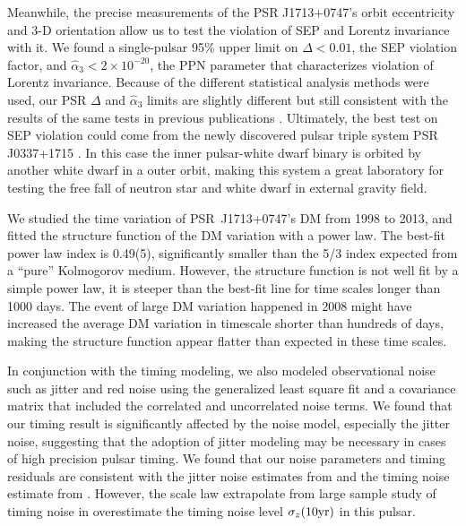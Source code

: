 
Meanwhile, the precise measurements of the PSR J1713+0747's orbit eccentricity and
3-D orientation allow us to test the violation of SEP and 
Lorentz invariance with it. We found a single-pulsar 95\% upper limit on 
$\Delta <0.01$, the SEP violation factor, and
$\hat{\alpha}_3<2\times10^{-20}$, the PPN parameter that characterizes
violation of Lorentz invariance. 
Because of the different statistical analysis methods were used, our PSR
$\Delta$ and $\hat{\alpha}_3$ limits  are slightly
different but still consistent with the results of the same tests in previous publications 
\citep{wex00, sns+05, sfl+05, gsf+11}.
Ultimately, the best test on SEP violation could come from the newly
discovered pulsar triple system PSR J0337+1715 \citep{rsa+14}. In this case 
the inner pulsar-white dwarf binary is orbited by another white dwarf in a
outer orbit, making this system a great laboratory for testing
the free fall of neutron star and white dwarf in external gravity field.

We studied the time variation of PSR~J1713+0747's DM from 1998 to 2013, and
fitted the structure function of the DM variation with a power law.  
The best-fit power law index is 0.49(5), significantly smaller than the 5/3 
index expected from a ``pure'' Kolmogorov medium. However, the structure
function is not well fit by a simple power law, it is steeper than the best-fit
 line for time scales longer than 1000 days. The event of large DM variation happened in 2008  
might have increased the average DM variation in timescale shorter than
hundreds of days, making the structure function appear flatter than expected
in these time scales.

In conjunction with the timing modeling, we also modeled observational noise
such as jitter and red noise
 using the generalized least square fit and a covariance matrix that included the
correlated and uncorrelated noise terms.
We found that our timing result is significantly affected by the noise
model, especially the jitter noise, suggesting that the adoption of jitter
modeling may be necessary in cases of high precision pulsar timing. 
We found that our noise parameters and timing residuals are consistent with the jitter
noise estimates from \citet{sc12} and the timing noise estimate from \citet{sc10}. However,
the scale law extrapolate from large sample study of timing noise in \citet{hlk10}
overestimate the timing noise level $\sigma_z({\rm 10 yr})$ in this pulsar.

